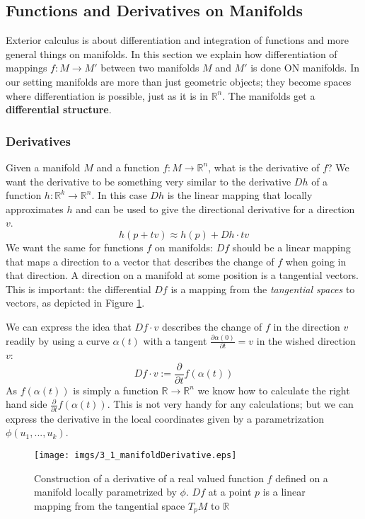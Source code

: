 \subsection{Functions and Derivatives on Manifolds}
\label{sec::2_derivativesOnMF}

Exterior calculus is about differentiation  and integration of functions and more general things on manifolds. In this section we explain how differentiation of mappings $f:M\to M'$ between two manifolds $M$ and $M'$ is done ON manifolds.  In our setting manifolds are more than just geometric objects; they become spaces where differentiation is possible, just as it is in $\mathbb R^n$. The manifolds get a \textbf{differential structure}.

\subsubsection{Derivatives}
Given a manifold $M$ and a function $f: M \rightarrow \mathbb R^n$, what is the derivative of $f$? We want the derivative to be something very similar to the derivative $Dh$ of a function $h: \mathbb R^k \rightarrow \mathbb R^n$. In this case $Dh$ is the linear mapping that locally approximates $h$ and can be used to give the directional derivative for a direction $v$.
\[h( p + tv) \approx h(p) + Dh \cdot tv\]
We want the same for functions $f$ on manifolds: $Df$ should be a linear mapping that maps a direction to a vector that describes the change of $f$ when going in that direction. A direction on a manifold at some position is a tangential vectors. This is important: the differential $Df$ is a mapping from the \emph{tangential spaces} to vectors, as depicted in Figure \ref{fig::3_1_manifoldDerivative}. 

We can express the idea that $Df\cdot v$ describes the change of $f$ in the direction $v$ readily by using a curve $\alpha (t)$ with a tangent $\frac{\partial \alpha(0)}{\partial t} = v$ in the wished direction $v$:
\begin{equation} Df \cdot v := \frac{\partial}{\partial t} f(\alpha(t)) \label{eq:2_1_derivativeDef}\end{equation}
As $f(\alpha(t))$ is simply a function $\mathbb R \rightarrow \mathbb R^n$ we know how to calculate the right hand side $\frac{\partial}{\partial t} f(\alpha(t))$. This is not very handy for any calculations; but we can express the derivative in the local coordinates given by a parametrization $\phi(u_1,...,u_k)$.

\begin{figure}
\begin{center}
\texttt{[image: imgs/3\_1\_manifoldDerivative.eps]}
\end{center}
\caption{Construction of a derivative of a real valued function $f$ defined on a manifold locally parametrized by $\phi$. $Df$ at a point $p$ is a linear mapping from the tangential space $T_p M$ to $\mathbb R$}
\label{fig::3_1_manifoldDerivative}
\end{figure}

